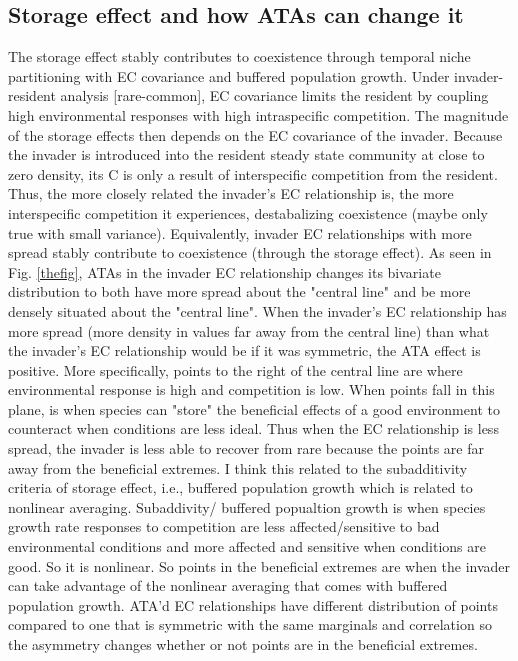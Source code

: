 \documentclass[letterpaper,11pt]{article}
\begin{document}
\subsection{Storage effect and how ATAs can change it}
The storage effect stably contributes to coexistence through 
temporal niche partitioning with EC covariance and buffered population growth.
Under invader-resident analysis [rare-common], EC covariance limits the resident by 
coupling high environmental responses with high intraspecific competition. The magnitude
of the storage effects then depends on the EC covariance of the invader. Because the 
invader is introduced into the resident steady state community at close to zero density, 
its C is only a result of interspecific competition from the resident. Thus, the more closely 
related the invader's EC relationship is, the more interspecific competition it experiences, 
destabalizing coexistence (maybe only true with small variance). Equivalently, invader EC relationships with more spread stably
contribute to coexistence (through the storage effect). As seen in Fig. \ref{thefig}, ATAs in 
the invader EC relationship changes its bivariate distribution to both have more spread 
about the "central line" and be more densely situated about the "central line".  
When the invader's EC relationship has more spread (more density in values far away from 
the central line) than what the invader's EC relationship would be if it was symmetric, 
the ATA effect is positive. More specifically, points to the right of the central line are where environmental response is high and competition is low. When points fall in this plane, is when species can "store" the beneficial effects of a good environment to counteract when conditions are less ideal. Thus when the EC relationship is less spread, the invader is less able to recover from rare because the points are far away from the beneficial extremes. 
I think this related to the subadditivity criteria of storage effect, i.e., buffered population growth which is related to nonlinear averaging. Subaddivity/ buffered popualtion growth is when species growth rate responses to competition are less affected/sensitive to bad environmental conditions and more affected and sensitive when conditions are good. So it is nonlinear. So points in the beneficial extremes are when the invader can take advantage of the nonlinear averaging that comes with buffered population growth. ATA'd EC relationships have different distribution of points compared to one that is symmetric with the same marginals and correlation so the asymmetry changes whether or not points are in the beneficial extremes.   
\end{document}
